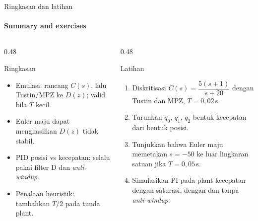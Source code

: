 \documentclass[aspectratio=169,10pt]{beamer}
\begin{document}
\begin{frame}{Ringkasan dan latihan}
	\framesubtitle{Summary and exercises}
	\begin{columns}[T]
		\begin{column}{0.48\textwidth}
			\begin{block}{Ringkasan}
				\small
				\begin{itemize}
					\item Emulasi: rancang $C(s)$, lalu Tustin/MPZ ke $D(z)$; valid bila $T$ kecil.
					\item Euler maju dapat menghasilkan $D(z)$ tidak stabil.
					\item PID posisi vs kecepatan; selalu pakai filter D dan \textit{anti-windup}.
					\item Penalaan heuristik: tambahkan $T/2$ pada tunda plant.
				\end{itemize}
			\end{block}
		\end{column}
		\begin{column}{0.48\textwidth}
			\begin{exampleblock}{Latihan}
				\small
				\begin{enumerate}
					\item Diskritisasi $C(s) = \dfrac{5(s+1)}{s+20}$ dengan Tustin dan MPZ, $T=0{,}02$\,s.
					\item Turunkan $q_0$, $q_1$, $q_2$ bentuk kecepatan dari bentuk posisi.
					\item Tunjukkan bahwa Euler maju memetakan $s=-50$ ke luar lingkaran satuan jika $T = 0{,}05$\,s.
					\item Simulasikan PI pada plant kecepatan dengan saturasi, dengan dan tanpa \textit{anti-windup}.
				\end{enumerate}
			\end{exampleblock}
		\end{column}
	\end{columns}
\end{frame}
\end{document}

